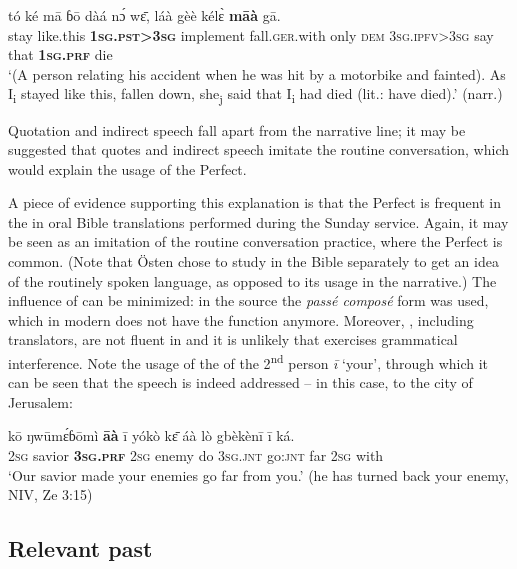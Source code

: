 \documentclass[output=paper]{LSP/langsci}
\begin{document}
\begin{exe} \ex
\label{khachexquot2}
\gll 	tó	ké	mā	ɓō	dàá	nɔ́	wɛ̄, láà	gèè	kélɛ̀	\textbf{māà}	gā.		\\
	stay	like.this	\textbf{1\textsc{sg}.\textsc{pst}>3\textsc{sg}}	implement fall.\textsc{ger}.with	only	\textsc{dem}	3\textsc{sg}.\textsc{ipfv}>3\textsc{sg}	say	that	\textbf{1\textsc{sg}.\textsc{prf}}	die\\
\glt ‘(A person relating his accident when he was hit by a motorbike and fainted). As I\textsubscript{i} stayed like this, fallen down, she\textsubscript{j} said that I\textsubscript{i} had died (lit.: have died).’ (narr.)
\end{exe}

Quotation and indirect speech fall apart from the narrative line; it may be suggested that quotes and indirect speech imitate the routine conversation, which would explain the usage of the Perfect. 

A piece of evidence supporting this explanation is that the Perfect is frequent in the  in oral Bible translations performed during the Sunday service. Again, it may be seen as an imitation of the routine conversation practice, where the Perfect is common. (Note that Östen \citet{khachdahl2014} chose to study  in the Bible separately to get an idea of the routinely spoken language, as opposed to its usage in the narrative.) The influence of  can be minimized: in the  source the \textit{passé composé} form was used, which in modern  does not have the  function anymore. Moreover, , including  translators, are not fluent in  and it is unlikely that  exercises grammatical interference. Note the usage of the  of the 2\textsuperscript{nd} person \textit{ī} `your', through which it can be seen that the speech is indeed addressed -- in this case, to the city of Jerusalem:

\begin{exe}\ex
\gll kō ŋwūmɛ́ɓōmì \textbf{āà} ī yókò kɛ̄ áà lò gbèkènī ī ká.\\
\textsc{2sg} savior \textbf{\textsc{3sg.prf}} \textsc{2sg} enemy do \textsc{3sg.jnt} go:\textsc{jnt} far \textsc{2sg} with\\
\glt `Our savior made your enemies go far from you.' (he has turned back your enemy, NIV, Ze 3:15)
\end{exe}


\subsection{Relevant past}
\end{document}
